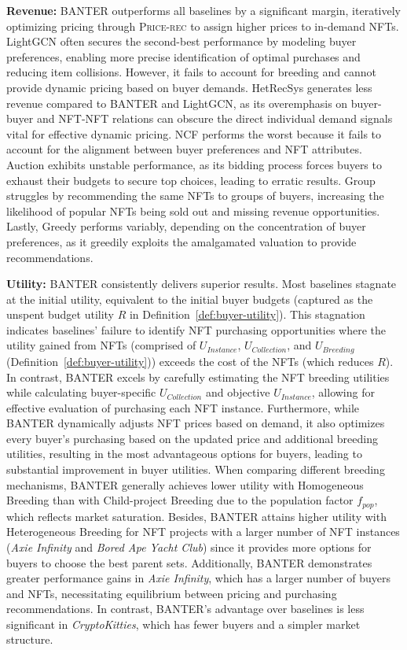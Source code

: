 \documentclass[conference]{IEEEtran}
\newcommand{\1}[1]{\mathds{1}\left[#1\right]}
\theoremstyle{plain}
\newcommand{\method}{\textsf{BANTER}\xspace}
\newcommand{\homob}{Homogeneous Breeding\xspace}
\newcommand{\heterb}{Heterogeneous Breeding\xspace}
\newcommand{\childb}{Child-project Breeding\xspace}
\newcommand{\findprice}{\textsc{Price-rec}\xspace}
\newcommand{\inlong}[1]{\opt{long}{#1}}
\begin{document}
\noindent\textbf{Revenue:} \method outperforms all baselines by a significant margin, iteratively optimizing pricing through \findprice to assign higher prices to in-demand NFTs. \textsf{LightGCN} often secures the second-best performance by modeling buyer preferences, enabling more precise identification of optimal purchases and reducing item collisions. However, it fails to account for breeding and cannot provide dynamic pricing based on buyer demands. \textsf{HetRecSys} generates less revenue compared to \method and \textsf{LightGCN}, as its overemphasis on buyer-buyer and NFT-NFT relations can obscure the direct individual demand signals vital for effective dynamic pricing. \textsf{NCF} performs the worst because it fails to account for the alignment between buyer preferences and NFT attributes. \textsf{Auction} exhibits unstable performance, as its bidding process forces buyers to exhaust their budgets to secure top choices, leading to erratic results. \textsf{Group} struggles by recommending the same NFTs to groups of buyers, increasing the likelihood of popular NFTs being sold out and missing revenue opportunities. Lastly, \textsf{Greedy} performs variably, depending on the concentration of buyer preferences, as it greedily exploits the amalgamated valuation to provide recommendations.

\noindent\textbf{Utility:} \inlong{For buyer utility, }\method consistently delivers superior results. Most baselines stagnate at the initial utility, equivalent to the initial buyer budgets (captured as the unspent budget utility $R$ in Definition~\ref{def:buyer-utility}). This stagnation indicates baselines' failure to identify NFT purchasing opportunities where the utility gained from NFTs (comprised of $U_\textit{Instance}$, $U_\textit{Collection}$, and $U_\textit{Breeding}$ (Definition~\ref{def:buyer-utility})) exceeds the cost of the NFTs (which reduces $R$). In contrast, \method excels by carefully estimating the NFT breeding utilities while calculating buyer-specific $U_\textit{Collection}$ and objective $U_\textit{Instance}$, allowing for effective evaluation of purchasing each NFT instance. Furthermore, while \method dynamically adjusts NFT prices based on demand, it also optimizes every buyer's purchasing based on the updated price and additional breeding utilities, resulting in the most advantageous options for buyers, leading to substantial improvement in buyer utilities. When comparing different breeding mechanisms, \method generally achieves lower utility with \homob than with \childb due to the population factor $f_{pop}$, which reflects market saturation. Besides, \method attains higher utility with \heterb for NFT projects with a larger number of NFT instances (\textit{Axie Infinity} and \textit{Bored Ape Yacht Club}) since it provides more options for buyers to choose the best parent sets. Additionally, \method demonstrates greater performance gains in \textit{Axie Infinity}, which has a larger number of buyers and NFTs, necessitating equilibrium between pricing and purchasing recommendations. In contrast, \method's advantage over baselines is less significant in \textit{CryptoKitties}, which has fewer buyers and a simpler market structure.
\end{document}
